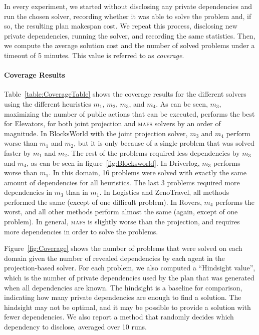 \documentclass{article}
\newcommand{\mafs}{\textsc {mafs}\xspace}
\theoremstyle{remark}
\begin{document}
In every experiment, we started without disclosing any private dependencies and run the chosen solver, recording whether it was able to solve the problem and, if so, the resulting plan makespan cost. 
We repeat this process, disclosing new private dependencies, running the solver, and recording the same statistics. Then, we compute the average solution cost and the number of solved problems under a timeout of 5 minutes. This value is referred to as \emph{coverage}.


\paragraph{Coverage Results}

Table~\ref{table:CoverageTable} shows the coverage results for the different solvers using the different heuristics $m_1$, 
$m_2$, $m_3$, and $m_4$. 
As can be seen, $m_3$, maximizing the number of public actions that can be executed, performs the best for Elevators, for both joint projection and \mafs solvers by an order of magnitude.
In BlocksWorld with the joint projection solver, $m_3$ and $m_4$ perform worse than $m_1$ and $m_2$, but it is only because of a single problem  that was solved faster by $m_1$ and $m_2$. The rest of the problems required less dependencies by $m_3$ and $m_4$, as can be seen in figure~\ref{fig:Blocksworld}.
In Driverlog, $m_3$ performs worse than $m_1$.
In this domain, 16 problems were solved with exactly the same amount of dependencies for all heuristics. The last 3 problems required more dependencies in $m_3$ than in $m_1$.
In Logistics and ZenoTravel, all methods performed the same (except of one difficult problem).
In Rovers, $m_4$ performs the worst, and all other methods perform almost the same (again, except of one problem).
In general, \mafs is slightly worse than the projection, and requires more dependencies in order to solve the problems.

Figure~\ref{fig:Coverage} shows the number of problems that were solved on each domain given the number of revealed dependencies by each agent in the projection-based solver. 
For each problem, we also computed a ``Hindsight value'', which is the number of private dependencies used by the plan that was generated when all dependencies are known. 
The hindsight is a baseline for comparison, indicating how many private dependencies are enough to find a solution. The hindsight may not be optimal, and it may be possible to provide a solution with fewer dependencies. We also report a method that randomly decides which dependency to disclose, averaged over 10 runs.
\end{document}
